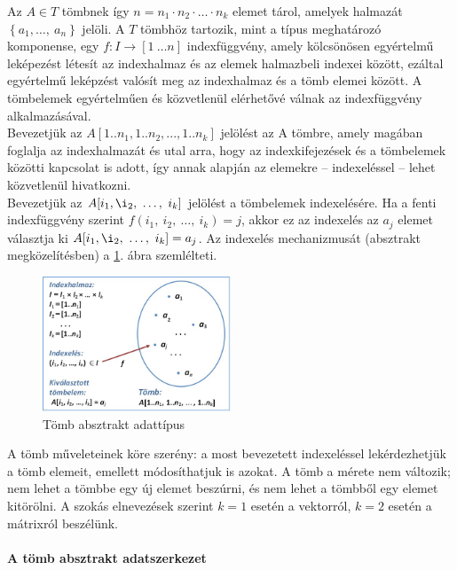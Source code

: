 \documentclass[12pt,margin=0px]{article}
\begin{document}
    \noindent Az $A \in T$ tömbnek így $n=n_1 \cdot n_2 \cdot \ldots \cdot n_k$ elemet tárol, amelyek halmazát $\left\{a_1, \ldots,\ a_n \right\}$ jelöli. A $T$ tömbhöz tartozik, mint a típus meghatározó komponense, egy $f: I \rightarrow \left[1\ \ldots n\right]$ indexfüggvény, amely kölcsönösen egyértelmű leképezést létesít az indexhalmaz és az elemek halmazbeli indexei között, ezáltal egyértelmű leképzést valósít meg az indexhalmaz és a tömb elemei között. A tömbelemek egyértelműen és közvetlenül elérhetővé válnak az indexfüggvény alkalmazásával.\\

    \noindent Bevezetjük az $A[1..n_1,1..n_2,...,1..n_k]$ jelölést az A tömbre, amely magában foglalja az indexhalmazát és utal arra, hogy az indexkifejezések és a tömbelemek közötti kapcsolat is adott, így annak alapján az elemekre – indexeléssel – lehet közvetlenül hivatkozni.\\

    \noindent Bevezetjük az $A[i_1,\i _2,\ \ldots,\ i_k]$ jelölést a tömbelemek indexelésére. Ha a fenti indexfüggvény szerint $f(i_1,\ i_2,\ \ldots,\ i_k) = j$, akkor ez az indexelés az $a_j$ elemet választja ki $A[i_1,\i _2,\ \ldots,\ i_k]=a_j$. Az indexelés mechanizmusát (absztrakt megközelítésben) a \ref{fig:array_adt}. ábra szemlélteti.

	\begin{figure}[H]
		\centering
		\includegraphics[width=0.5\textwidth]{img/array_adt.png}
		\caption{Tömb absztrakt adattípus}
        \label{fig:array_adt}
	\end{figure}

    \noindent A tömb műveleteinek köre szerény: a most bevezetett indexeléssel lekérdezhetjük a tömb elemeit, emellett módosíthatjuk is azokat. A tömb a mérete nem változik; nem lehet a tömbbe egy új elemet beszúrni, és nem lehet a tömbből egy elemet kitörölni. A szokás elnevezések szerint $k=1$ esetén a vektorról, $k=2$ esetén a mátrixról beszélünk.

    \paragraph{A tömb absztrakt adatszerkezet\\\\}
\end{document}
